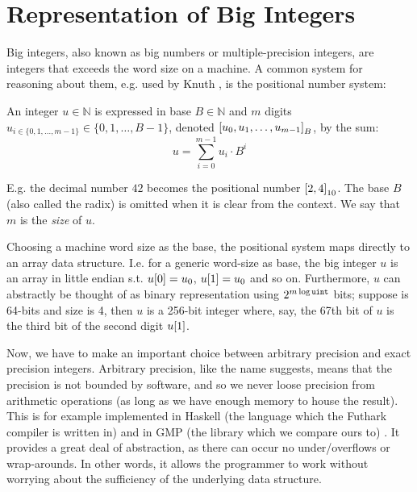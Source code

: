 \section{Representation of Big Integers}
\label{sec:big}
Big integers, also known as big numbers or multiple-precision integers, are
integers that exceeds the word size on a machine. A common system for reasoning
about them, e.g. used by Knuth \cite{knuth97}, is the positional number
system:
 
\begin{definition}\label{def:bigints}
  An integer $u \in \mathbb{N}$ is expressed in base $B \in \mathbb{N}$ and
  $m$ digits $u_{i\in \{0,1,\ldots,m-1\}}\in\{0,1,\ldots,B-1\}$, denoted $\mathtt{[}u_0, u_1,\ldots,u_{m-1}\mathtt{]}_{B}$, by the sum:
  \begin{equation}
\label{eq:rep}
u = \sum_{i=0}^{m-1}u_i\cdot B^{i}
\end{equation}
\end{definition}

E.g. the decimal number $42$ becomes the positional number $\mathtt{[}2,
  4\mathtt{]}_{10}$. The base $B$ (also called the radix) is omitted when it is clear
from the context. We say that $m$ is the \textit{size} of $u$.

Choosing a machine word size as the base, the positional system maps directly to
an array data structure. I.e. for a generic word-size \uint{} as base, the big
integer $u$ is an array in little endian s.t. $u\mathtt{[}0\mathtt{]} = u_0$, $u\mathtt{[}1\mathtt{]} = u_0$ and so
on. Furthermore, $u$ can abstractly be thought of as binary representation using
$2^{m\log \texttt{uint}{}}$ bits; suppose \uint{} is 64-bits and size is 4, then $u$ is
a 256-bit integer where, say, the 67th bit of $u$ is the third bit of the second
digit $u\mathtt{[}1\mathtt{]}$.


Now, we have to make an important choice between arbitrary precision and exact
precision integers. Arbitrary precision, like the name suggests, means that the
precision is not bounded by software, and so we never loose precision from
arithmetic operations (as long as we have enough memory to house the
result). This is for example implemented in Haskell (the language which the
Futhark compiler is written in) and in GMP (the library which we compare ours
to) \cite{GMP} \cite{marlow2010haskell}. It provides a great deal of
abstraction, as there can occur no under/overflows or wrap-arounds. In other
words, it allows the programmer to work without worrying about the sufficiency
of the underlying data structure.

